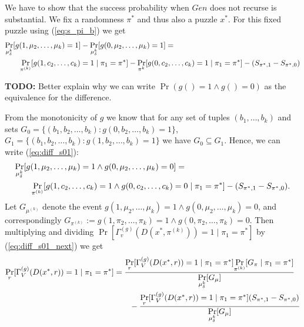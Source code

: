 We have to show that the success probability when $Gen$ does not recurse is substantial.
We fix a randomness $\pi^*$ and thus also a puzzle $x^*$. For this fixed puzzle using (\ref{eq:s_pi_b}) we get
\begin{align}
\label{eq:diff_s01}
  &\underset{\mu_{\delta}^k}{\Pr}[g(1, \mu_2, \dots, \mu_k)=1] - \underset{\mu_{\delta}^k}{\Pr}[g(0, \mu_2, \dots, \mu_k)=1] = \notag\\
&\mbox\qquad  \underset{\pi^{(k)}}{\Pr}[g(1, c_2, \dots, c_k) =1 \mid \pi_1 = \pi^*] - \underset{\pi^k}{\Pr}[g(0, c_2, \dots, c_k) = 1 \mid \pi_1 = \pi^*] - (S_{\pi^*,1} - S_{\pi^*,0})
\end{align}
\begin{todo}
  \textbf{TODO:} Better explain why we can write $\Pr(g() = 1 \land g() = 0)$ as the equivalence for the difference.
\end{todo}
From the monotonicity of $g$ we know that for any set of tuples $(b_1, \dots, b_k)$
and sets $G_0 = \{ (b_1, b_2, \dots, b_k): g(0, b_2, \dots, b_k) = 1\}$, $ G_1 = \{(b_1, b_2, \dots, b_k) : g(1, b_2, \dots, b_k) = 1 \}$
we have $G_0 \subseteq G_1$. Hence, we can write (\ref{eq:diff_s01}):
\begin{align}
  \label{eq:diff_s01_next}
  &\underset{\mu_{\delta}^k}{\Pr}[g(1, \mu_2, \dots, \mu_k) = 1 \land g(0, \mu_2, \dots, \mu_k) = 0] = \notag\\
&\mbox\qquad  \underset{\pi^{(k)}}{\Pr}[g(1, c_2, \dots, c_k) = 1 \land g(0, c_2, \dots, c_k) = 0 \mid \pi_1 = \pi^*] - (S_{\pi^*,1} - S_{\pi^*,0}).
\end{align}
Let $G_{\mu^{(k)}}$ denote the event $g(1, \mu_2, \dots, \mu_k) = 1 \land g(0, \mu_2, \dots, \mu_k) = 0$, and correspondingly
$G_{\pi^{(k)}} := g(1, \pi_2, \dots, \pi_k) = 1 \land g(0, \pi_2, \dots, \pi_k) = 0$.
Then multiplying and dividing $\underset{}{\Pr}[\Gamma_v^{(g)}(D(x^*, \pi^{(k)})) = 1 \mid \pi_1 = \pi^*]$ by (\ref{eq:diff_s01_next}) we get
\begin{align}
\label{eq:pr_d_succ_0}
  \underset{r}{\Pr}[\Gamma_V^{(g)}(D(x^*, r)) = 1 \mid \pi_1 = \pi^*] &=
  \frac{\underset{r}{\Pr}[\Gamma_V^{(g)}(D(x^*, r)) = 1 \mid \pi_1 = \pi^*] \underset{\pi^{(k)}}{\Pr}[G_{\pi} \mid \pi_1 = \pi^*]} {\underset{\mu_{\delta}^{k}}{\Pr}[G_{\mu}]} \notag\\
  & \mbox\qquad - \frac{\underset{r}{\Pr}[\Gamma_V^{(g)}(D(x^*, r)) = 1 \mid \pi_1 = \pi^*](S_{\pi^*,1} - S_{\pi^*,0})}{\underset{\mu_{\delta}^{k}}{\Pr}[G_{\mu}]}
\end{align}
%
